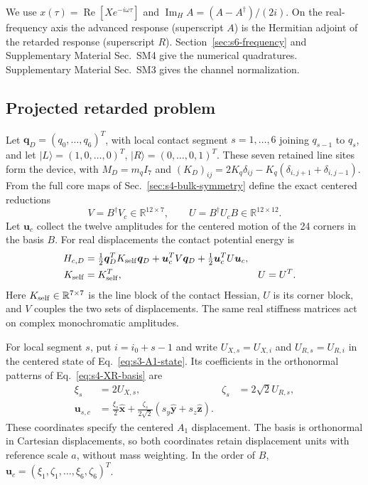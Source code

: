 \documentclass[10pt,aps,onecolumn,floatfix,notitlepage,nofootinbib,showkeys]{revtex4-2}
\newcommand{\vu}{\bm{u}}
\newcommand{\vq}{\bm{q}}
\newcommand{\ex}{\hat{\bm{x}}}
\newcommand{\ey}{\hat{\bm{y}}}
\newcommand{\ez}{\hat{\bm{z}}}
\newcommand{\ImH}{\operatorname{Im}_{\!H}}
\begin{document}
We use $x(\tau)=\operatorname{Re}[Xe^{-i\omega\tau}]$ and $\ImH A=(A-A^\dagger)/(2i)$. On the real-frequency axis the advanced response (superscript $A$) is the Hermitian adjoint of the retarded response (superscript $R$). Section~\ref{sec:s6-frequency} and Supplementary Material Sec.~SM4 give the numerical quadratures. Supplementary Material Sec.~SM3 gives the channel normalization.

\subsection{Projected retarded problem}
\label{sec:s5-projected}

Let $\vq_D=(q_0,\ldots,q_6)^T$, with local contact segment $s=1,\ldots,6$ joining $q_{s-1}$ to $q_s$, and let $|L\rangle=(1,0,\ldots,0)^T$, $|R\rangle=(0,\ldots,0,1)^T$.  These seven retained line sites form the device, with $M_D=m_qI_7$ and $(K_D)_{ij}=2K_q\delta_{ij}-K_q(\delta_{i,j+1}+\delta_{i,j-1})$.  From the full core maps of Sec.~\ref{sec:s4-bulk-symmetry} define the exact centered reductions
\begin{equation}
  V=B^\dagger V_c\in\mathbb R^{12\times7},
  \qquad
  U=B^\dagger U_cB\in\mathbb R^{12\times12}.
  \label{eq:s5-reduced-source-matrices}
\end{equation}
Let $\vu_c$ collect the twelve amplitudes for the centered motion of the 24 corners in the basis $B$. For real displacements the contact potential energy is
\begin{align}
 H_{c,D}
 &=\tfrac12\vq_D^T K_{\rm self}\vq_D
 +\vu_c^T V\vq_D
 +\tfrac12\vu_c^T U\vu_c,\\
 K_{\rm self}&=K_{\rm self}^T,
 &U&=U^T.
 \label{eq:s5-block-stiffness}
\end{align}
Here $K_{\rm self}\in\mathbb R^{7\times7}$ is the line block of the contact Hessian, $U$ is its corner block, and $V$ couples the two sets of displacements. The same real stiffness matrices act on complex monochromatic amplitudes.

For local segment $s$, put $i=i_0+s-1$ and write $U_{X,s}=U_{X,i}$ and $U_{R,s}=U_{R,i}$ in the centered state of Eq.~\eqref{eq:s3-A1-state}. Its coefficients in the orthonormal patterns of Eq.~\eqref{eq:s4-XR-basis} are
\begin{align}
 \xi_s&=2U_{X,s}, & \zeta_s&=2\sqrt2 U_{R,s},\nonumber\\
 \vu_{s,c}&=\frac{\xi_s}{2}\ex
 +\frac{\zeta_s}{2\sqrt2}(s_y\ey+s_z\ez).
 \label{eq:s5-segment-coordinates}
\end{align}
These coordinates specify the centered $A_1$ displacement. The basis is orthonormal in Cartesian displacements, so both coordinates retain displacement units with reference scale $a$, without mass weighting. In the order of $B$, $\vu_c=(\xi_1,\zeta_1,\ldots,\xi_6,\zeta_6)^T$.
\end{document}
